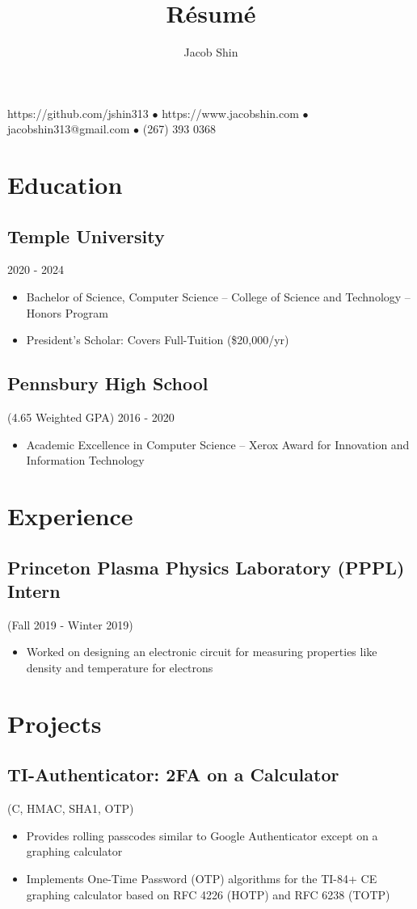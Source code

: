 \documentclass{article}
\makeatletter
\renewcommand{\maketitle}{
    \begin{center}
        {\huge\bfseries
        \theauthor}
    \end{center}
    \begin{center}
        \vspace{1em}
        \leavevmode
        https://github.com/jshin313 $\bullet$ https://www.jacobshin.com $\bullet$ jacobshin313@gmail.com $\bullet$ (267) 393 0368
    \end{center}
}
\makeatother
\begin{document}
\title{R\'esum\'e}
\author{Jacob Shin}

\maketitle
\section{Education}
\subsection{Temple University}\hspace{31em} 2020 - 2024
\begin{itemize}
    \item Bachelor of Science, Computer Science -- College of Science and Technology -- Honors Program
    \item President's Scholar: Covers Full-Tuition (\$20,000/yr)
\end{itemize}

\subsection{Pennsbury High School}(4.65 Weighted GPA)\hspace{19em} 2016 - 2020
\begin{itemize}
    \item Academic Excellence in Computer Science -- Xerox Award for Innovation and Information Technology
\end{itemize}

\section{Experience}
\subsection{Princeton Plasma Physics Laboratory (PPPL) Intern} (Fall 2019 - Winter 2019)
\begin{itemize}
    \item Worked on designing an electronic circuit for measuring properties like density and temperature for electrons
\end{itemize}

\section{Projects}
\subsection{TI-Authenticator: 2FA on a Calculator} (C, HMAC, SHA1, OTP)
\begin{itemize}
    \item Provides rolling passcodes similar to Google Authenticator except on a graphing calculator
    \item Implements One-Time Password (OTP) algorithms for the TI-84+ CE graphing calculator based on RFC 4226 (HOTP) and RFC 6238 (TOTP)
\end{itemize}
\end{document}
